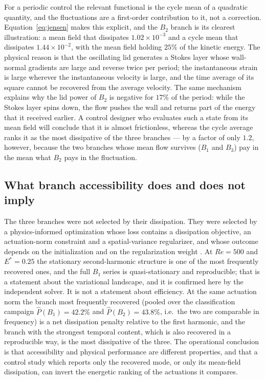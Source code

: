 \documentclass[11pt,a4paper]{article}
\begin{document}
For a periodic control the relevant functional is the cycle mean of a quadratic
quantity, and the fluctuations are a first-order contribution to it, not a
correction. Equation~\eqref{eq:jensen} makes this explicit, and the $B_2$ branch
is its clearest illustration: a mean field that dissipates $1.02\times10^{-3}$ and
a cycle mean that dissipates $1.44\times10^{-2}$, with the mean field holding $25\%$
of the kinetic energy. The physical reason is that the oscillating lid generates a
Stokes layer whose wall-normal gradients are large and reverse twice per period;
the instantaneous strain is large wherever the instantaneous velocity
is large, and the time average of its square cannot be recovered from the average
velocity. The same mechanism explains why the lid power of $B_2$ is negative for
$17\%$ of the period: while the Stokes layer spins down, the flow pushes the wall
and returns part of the energy that it received earlier. A control designer who
evaluates such a state from its mean field will conclude that it is almost
frictionless, whereas the cycle average ranks it as the most dissipative of the
three branches --- by a factor of only $1.2$, however, because the two branches
whose mean flow survives ($B_1$ and $B_3$) pay in the mean what $B_2$ pays in the
fluctuation.

\subsection{What branch accessibility does and does not imply}

The three branches were not selected by their dissipation. They were selected by a
physics-informed optimization whose loss contains a dissipation objective, an
actuation-norm constraint and a spatial-variance regularizer, and whose outcome
depends on the initialization and on the regularization weight
\cite{beniaiche2026}. At $Re=500$ and $E^\ast=0.25$ the stationary
second-harmonic structure is one of the most frequently recovered ones, and the full
$B_1$ series is quasi-stationary and reproducible; that is a statement about the
variational landscape, and it is confirmed here by the independent solver. It is
not a statement about efficiency. At the same actuation norm the branch most
frequently recovered (pooled over the classification campaign
$\widehat{P}(B_1)=42.2\%$ and $\widehat{P}(B_2)=43.8\%$, i.e.\ the two are
comparable in frequency) is a net dissipation penalty relative to the first harmonic,
and the branch with the strongest temporal content, which is also recovered in a
reproducible way, is the most dissipative of the three. The operational
conclusion is that accessibility and physical performance are different
properties, and that a control study which reports only the recovered mode, or
only its mean-field dissipation, can invert the energetic ranking of the
actuations it compares.
\end{document}
